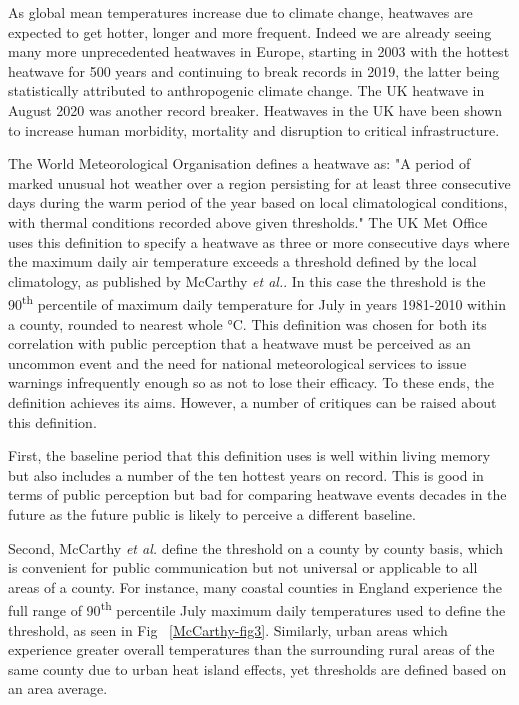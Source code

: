 \documentclass[10pt,letterpaper]{article}
\begin{document}
As global mean temperatures increase due to climate change, heatwaves are expected to get hotter, longer and more frequent. 
Indeed we are already seeing many more unprecedented heatwaves in Europe, starting in 2003 with the hottest heatwave for 500 years\cite{Stott2004} and continuing to break records in 2019, the latter being statistically attributed to anthropogenic climate change.\cite{Vautard2020} 
The UK heatwave in August 2020 was another record breaker.\cite{Askew2020}
Heatwaves in the UK have been shown to increase human morbidity\cite{Smith2016}, mortality\cite{Johnson2004} and disruption to critical infrastructure.\cite{Dawson2016}


The World Meteorological Organisation defines a heatwave as\cite{WMO2018}:
"A period of marked unusual hot weather over a region persisting for at least three consecutive days during the warm period of the year based on local climatological conditions, with thermal conditions recorded above given thresholds."
The UK Met Office uses this definition to specify a heatwave as three or more consecutive days where the maximum daily air temperature exceeds a threshold defined by the local climatology, as published by McCarthy \textit{et al.}.\cite{McCarthy2019}
In this case the threshold is the 90{\textsuperscript{th}} percentile of maximum daily temperature for July in years 1981-2010 within a county, rounded to nearest whole °C.
This definition was chosen for both its correlation with public perception that a heatwave must be perceived as an uncommon event and the need for national meteorological services to issue warnings infrequently enough so as not to lose their efficacy.
To these ends, the definition achieves its aims.
However, a number of critiques can be raised about this definition.

First, the baseline period that this definition uses is well within living memory but also includes a number of the ten hottest years on record.\cite{McCarthy2019}
This is good in terms of public perception but bad for comparing heatwave events decades in the future as the future public is likely to perceive a different baseline.

Second, McCarthy \textit{et al.} define the threshold on a county by county basis, which is convenient for public communication but not universal or applicable to all areas of a county.
For instance, many coastal counties in England experience the full range of 90\textsuperscript{th} percentile July maximum daily temperatures used to define the threshold, as seen in Fig ~\ref{McCarthy-fig3}.\cite{McCarthy2019}
Similarly, urban areas which experience greater overall temperatures than the surrounding rural areas of the same county due to urban heat island effects, yet thresholds are defined based on an area average.
\end{document}

